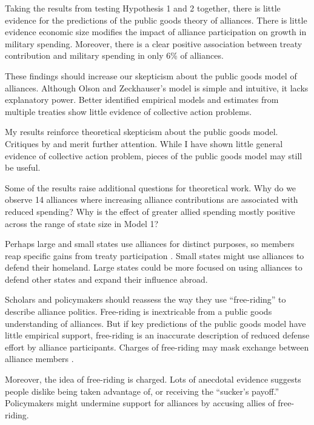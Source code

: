 \documentclass[12pt]{article}
\begin{document}
Taking the results from testing Hypothesis 1 and 2 together, there is little evidence for the predictions of the public goods theory of alliances. 
There is little evidence economic size modifies the impact of alliance participation on growth in military spending.
Moreover, there is a clear positive association between treaty contribution and military spending in only 6\% of alliances. 


These findings should increase our skepticism about the public goods model of alliances. 
Although Olson and Zeckhauser's model is simple and intuitive, it lacks explanatory power. 
Better identified empirical models and estimates from multiple treaties show little evidence of collective action problems. 


My results reinforce theoretical skepticism about the public goods model. 
Critiques by \citet{Palmer1990} and \citet{SandlerHartley2001} merit further attention. 
While I have shown little general evidence of collective action problem, pieces of the public goods model may still be useful. 


Some of the results raise additional questions for theoretical work. 
Why do we observe 14 alliances where increasing alliance contributions are associated with reduced spending?
Why is the effect of greater allied spending mostly positive across the range of state size in Model 1? 


Perhaps large and small states use alliances for distinct purposes, so members reap specific gains from treaty participation \citep{Morrow1991}. 
Small states might use alliances to defend their homeland. 
Large states could be more focused on using alliances to defend other states and expand their influence abroad. 


Scholars and policymakers should reassess the way they use ``free-riding'' to describe alliance politics. 
Free-riding is inextricable from a public goods understanding of alliances.
But if key predictions of the public goods model have little empirical support, free-riding is an inaccurate description of reduced defense effort by alliance participants.  
Charges of free-riding may mask exchange between alliance members \citep{Lanoszka2015}. 


Moreover, the idea of free-riding is charged. 
Lots of anecdotal evidence suggests people dislike being taken advantage of, or receiving the ``sucker's payoff.'' 
Policymakers might undermine support for alliances by accusing allies of free-riding. 
\end{document}
